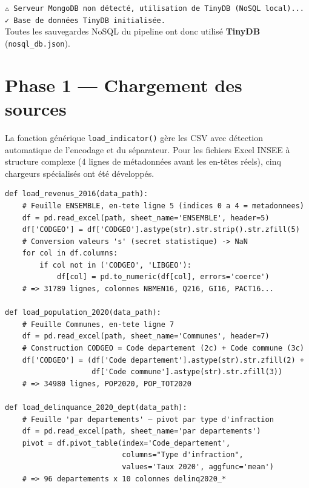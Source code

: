 \documentclass[12pt,a4paper,oneside]{report}
\newcommand{\code}[1]{\texttt{\small #1}}
\begin{document}
\begin{warnbox}
\texttt{⚠️ Serveur MongoDB non détecté, utilisation de TinyDB (NoSQL local)...}\\
\texttt{✓ Base de données TinyDB initialisée.}\\
Toutes les sauvegardes NoSQL du pipeline ont donc utilisé \textbf{TinyDB} (\texttt{nosql\_db.json}).
\end{warnbox}

\section{Phase 1 — Chargement des sources}

La fonction générique \code{load\_indicator()} gère les CSV avec détection automatique de l'encodage et du séparateur. Pour les fichiers Excel INSEE à structure complexe (4 lignes de métadonnées avant les en-têtes réels), cinq chargeurs spécialisés ont été développés.

\begin{lstlisting}[caption={Chargeurs spécialisés pour les fichiers Excel INSEE (structure réelle)}]
def load_revenus_2016(data_path):
    # Feuille ENSEMBLE, en-tete ligne 5 (indices 0 a 4 = metadonnees)
    df = pd.read_excel(path, sheet_name='ENSEMBLE', header=5)
    df['CODGEO'] = df['CODGEO'].astype(str).str.strip().str.zfill(5)
    # Conversion valeurs 's' (secret statistique) -> NaN
    for col in df.columns:
        if col not in ('CODGEO', 'LIBGEO'):
            df[col] = pd.to_numeric(df[col], errors='coerce')
    # => 31789 lignes, colonnes NBMEN16, Q216, GI16, PACT16...

def load_population_2020(data_path):
    # Feuille Communes, en-tete ligne 7
    df = pd.read_excel(path, sheet_name='Communes', header=7)
    # Construction CODGEO = Code departement (2c) + Code commune (3c)
    df['CODGEO'] = (df['Code departement'].astype(str).str.zfill(2) +
                    df['Code commune'].astype(str).str.zfill(3))
    # => 34980 lignes, POP2020, POP_TOT2020

def load_delinquance_2020_dept(data_path):
    # Feuille 'par departements' — pivot par type d'infraction
    df = pd.read_excel(path, sheet_name='par departements')
    pivot = df.pivot_table(index='Code_departement',
                           columns="Type d'infraction",
                           values='Taux 2020', aggfunc='mean')
    # => 96 departements x 10 colonnes delinq2020_*
\end{lstlisting}
\end{document}
